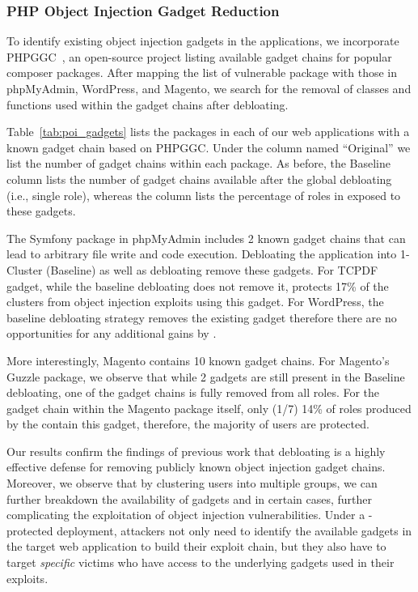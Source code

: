 \subsubsection{PHP Object Injection Gadget Reduction}

To identify existing object injection gadgets in the applications, we incorporate PHPGGC~\cite{PHPGGC}, an open-source project listing available gadget chains for popular composer packages. 
After mapping the list of vulnerable package with those in phpMyAdmin, WordPress, and Magento, we search for the removal of classes and functions used within the gadget chains after debloating. 

Table~\ref{tab:poi_gadgets} lists the packages in each of our web applications with a known gadget chain based on PHPGGC. 
Under the column named ``Original'' we list the number of gadget chains within each package. 
As before, the Baseline column lists the number of gadget chains available after the global debloating (i.e., single role), whereas the \dbltr{} column lists the percentage of roles in \dbltr{} exposed to these gadgets. 

The Symfony package in phpMyAdmin includes 2 known gadget chains that can lead to arbitrary file write and code execution. 
Debloating the application into 1-Cluster (Baseline) as well as \dbltr{} debloating remove these gadgets. 
For TCPDF gadget, while the baseline debloating does not remove it, \dbltr{} protects 17\% of the clusters from object injection exploits using this gadget. 
For WordPress, the baseline debloating strategy removes the existing gadget therefore there are no opportunities for any additional gains by \dbltr{}.

More interestingly, Magento contains 10 known gadget chains. 
For Magento's Guzzle package, we observe that while 2 gadgets are still present in the Baseline debloating, one of the gadget chains is fully removed from all roles.
For the gadget chain within the Magento package itself, only (1/7) 14\% of roles produced by the \dbltr{} contain this gadget, therefore, the majority of users are protected.

Our results confirm the findings of previous work that debloating is a highly effective defense for removing publicly known object injection gadget chains. 
Moreover, we observe that by clustering users into multiple groups, we can further breakdown the availability of gadgets and in certain cases, further complicating the exploitation of object injection vulnerabilities. Under a \dbltr{}-protected deployment, attackers not only need to identify the available gadgets in the target web application to build their exploit chain, but they also have to target \emph{specific} victims who have access to the underlying gadgets used in their exploits. 


